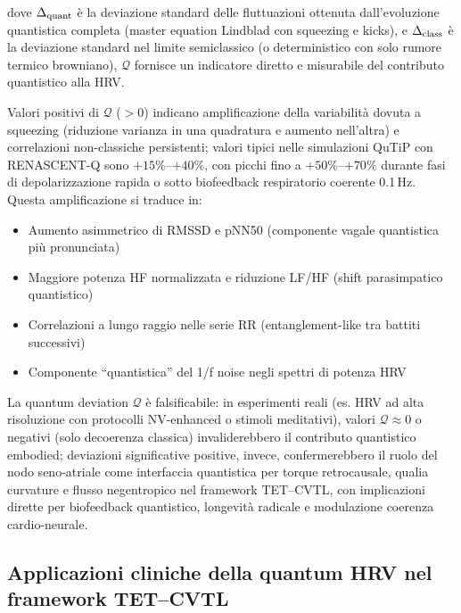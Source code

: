 \documentclass[11pt,a4paper]{article}
\theoremstyle{plain}
\theoremstyle{definition}
\begin{document}
dove $\Delta_{\rm quant}$ è la deviazione standard delle fluttuazioni ottenuta dall'evoluzione quantistica completa (master equation Lindblad con squeezing e kicks), e $\Delta_{\rm class}$ è la deviazione standard nel limite semiclassico (o deterministico con solo rumore termico browniano), $\mathcal{Q}$ fornisce un indicatore diretto e misurabile del contributo quantistico alla HRV.

Valori positivi di $\mathcal{Q}$ ($>0$) indicano amplificazione della variabilità dovuta a squeezing (riduzione varianza in una quadratura e aumento nell'altra) e correlazioni non-classiche persistenti; valori tipici nelle simulazioni QuTiP con RENASCENT-Q sono $+15\%$--$+40\%$, con picchi fino a $+50\%$--$+70\%$ durante fasi di depolarizzazione rapida o sotto biofeedback respiratorio coerente 0.1\,Hz. Questa amplificazione si traduce in:

\begin{itemize}
    \item Aumento asimmetrico di RMSSD e pNN50 (componente vagale quantistica più pronunciata)
    \item Maggiore potenza HF normalizzata e riduzione LF/HF (shift parasimpatico quantistico)
    \item Correlazioni a lungo raggio nelle serie RR (entanglement-like tra battiti successivi)
    \item Componente ``quantistica'' del 1/f noise negli spettri di potenza HRV
\end{itemize}

La quantum deviation $\mathcal{Q}$ è falsificabile: in esperimenti reali (es. HRV ad alta risoluzione con protocolli NV-enhanced o stimoli meditativi), valori $\mathcal{Q} \approx 0$ o negativi (solo decoerenza classica) invaliderebbero il contributo quantistico embodied; deviazioni significative positive, invece, confermerebbero il ruolo del nodo seno-atriale come interfaccia quantistica per torque retrocausale, qualia curvature e flusso negentropico nel framework TET–CVTL, con implicazioni dirette per biofeedback quantistico, longevità radicale e modulazione coerenza cardio-neurale.







\subsection{Applicazioni cliniche della quantum HRV nel framework TET–CVTL}
\label{subsec:clinical-applications-quantum-hrv}
\end{document}
